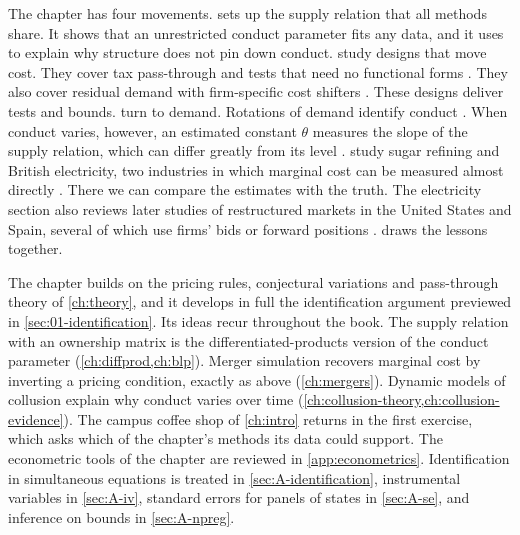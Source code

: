 The chapter has four movements.  sets up the supply relation that all methods share. It shows
that an unrestricted conduct parameter fits any data, and it uses \citet{Stigler1964} to explain why structure does not
pin down conduct.  study designs that move cost. They
cover tax pass-through \citep{Sumner1981} and tests that need no functional forms
\citep{Sullivan1985,AshenfelterSullivan1987,PanzarRosse1987}. They also cover residual demand with firm-specific cost
shifters \citep{BakerBresnahan1988}. These designs deliver tests and bounds. 
turn to demand. Rotations of demand identify conduct \citep{Bresnahan1982,Lau1982}. When conduct varies, however, an
estimated constant $\theta$ measures the slope of the supply relation, which can differ greatly from its level
\citep{Corts1999}.  study sugar refining and British electricity, two industries
in which marginal cost can be measured almost directly \citep{GenesoveMullin1998,Wolfram1999}. There we can compare the
estimates with the truth. The electricity section also reviews later studies of restructured markets in the United
States and Spain, several of which use firms' bids or forward positions \citep{KelloggReguant2021}.
 draws the lessons
together.

The chapter builds on the pricing rules, conjectural variations and pass-through theory of \cref{ch:theory}, and it
develops in full the identification argument previewed in \cref{sec:01-identification}. Its ideas recur throughout the
book. The supply relation with an ownership matrix is the differentiated-products version of the conduct parameter
(\cref{ch:diffprod,ch:blp}). Merger simulation recovers marginal cost by inverting a pricing condition, exactly as above
(\cref{ch:mergers}). Dynamic models of collusion explain why conduct varies over time
(\cref{ch:collusion-theory,ch:collusion-evidence}). The campus coffee shop of \cref{ch:intro} returns in the first
exercise, which asks which of the chapter's methods its data could support. The econometric tools of the chapter are
reviewed in \cref{app:econometrics}. Identification in simultaneous equations is treated in \cref{sec:A-identification},
instrumental variables in \cref{sec:A-iv}, standard errors for panels of states in \cref{sec:A-se}, and inference
on bounds in \cref{sec:A-npreg}.








